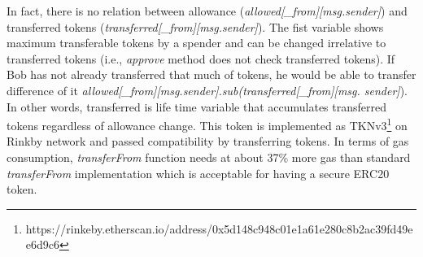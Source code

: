 In fact, there is no relation between allowance (\textit{allowed[\_from][msg.sender]}) and transferred tokens (\textit{transferred[\_from][msg.sender]}). The fist variable shows maximum transferable tokens by a spender and can be changed irrelative to transferred tokens (i.e., \textit{approve} method does not check transferred tokens). If Bob has not already transferred that much of tokens, he would be able to transfer difference of it \textit{allowed[\_from][msg.sender].sub(transferred[\_from][msg. sender]}). In other words, transferred is life time variable that accumulates transferred tokens regardless of allowance change. This token is implemented as TKNv3\footnote{https://rinkeby.etherscan.io/address/0x5d148c948c01e1a61e280c8b2ac39\newline fd49ee6d9c6} on Rinkby network and passed compatibility by transferring tokens. In terms of gas consumption, \textit{transferFrom} function needs at about 37\% more gas than standard \textit{transferFrom} implementation which is acceptable for having a secure ERC20 token.
